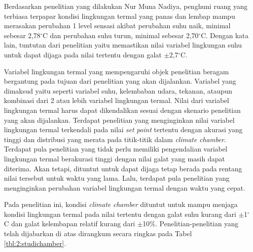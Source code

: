 Berdasarkan penelitian yang dilakukan Nur Muna Nadiya\cite{skripsiMuna}, penghuni ruang yang terbiasa terpapar kondisi lingkungan termal yang panas dan lembap mampu merasakan perubahan 1 level sensasi akibat perubahan suhu naik, minimal sebesar 2,78$^{\circ}$C dan perubahan suhu turun, minimal sebesar 2,70$^{\circ}$C. Dengan kata lain, tuntutan dari penelitian yaitu memastikan nilai variabel lingkungan suhu untuk dapat dijaga pada nilai tertentu dengan galat $\pm$2,7$^{\circ}$C. 

Variabel lingkungan termal yang mempengaruhi objek penelitian beragam bergantung pada tujuan dari penelitian yang akan dijalankan. Variabel yang dimaksud yaitu seperti variabel suhu, kelembaban udara, tekanan, ataupun kombinasi dari 2 atau lebih variabel lingkungan termal. Nilai dari variabel lingkungan termal harus dapat dikendalikan sesuai dengan skenario penelitian yang akan dijalankan. Terdapat penelitian yang menginginkan nilai variabel lingkungan termal terkendali pada nilai \textit{set point} tertentu dengan akurasi yang tinggi dan distribusi yang merata pada titik-titik dalam \textit{climate chamber}. Terdapat pula penelitian yang tidak perlu memiliki pengendalian variabel lingkungan termal berakurasi tinggi dengan nilai galat yang masih dapat diterima. Akan tetapi, dituntut untuk dapat dijaga tetap berada pada rentang nilai tersebut untuk waktu yang lama. Lalu, terdapat pula penelitian yang menginginkan perubahan variabel lingkungan termal dengan waktu yang cepat. 

Pada penelitian ini, kondisi \textit{climate chamber} dituntut untuk mampu menjaga kondisi lingkungan termal pada nilai tertentu dengan galat suhu kurang dari $\pm$1$^{\circ}$C dan galat kelembapan relatif kurang dari $\pm$10\%. Penelitian-penelitian yang telah dijabarkan di atas dirangkum secara ringkas pada Tabel \ref{tbl:2:studichamber}. 

